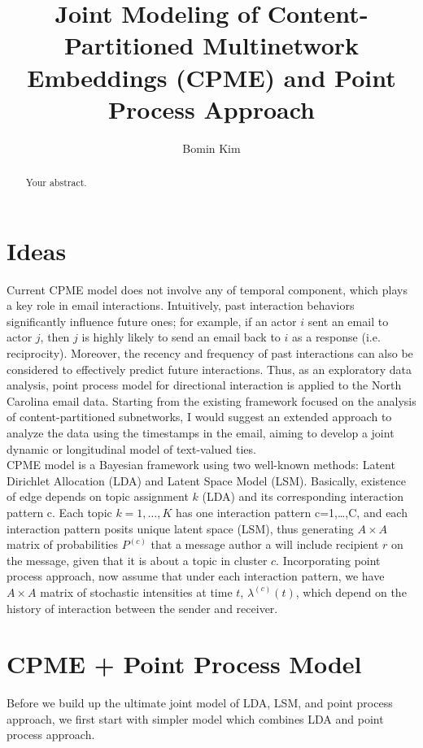 \documentclass[a4paper]{article}
\title{Joint Modeling of Content-Partitioned Multinetwork Embeddings (CPME) and Point Process Approach}
\author{Bomin Kim}
\begin{document}
\maketitle

\begin{abstract}
Your abstract.
\end{abstract}

\section{Ideas}
Current CPME model does not involve any of temporal component, which plays a key role in email interactions. Intuitively, past interaction behaviors significantly influence future ones; for example, if an actor $i$ sent an email to actor $j$, then $j$ is highly likely to send an email back to $i$ as a response (i.e. reciprocity). Moreover, the recency and frequency of past interactions can also be considered to effectively predict future interactions. Thus, as an exploratory data analysis, point process model for directional interaction is applied to the North Carolina email data. Starting from the existing framework focused on the analysis of content-partitioned subnetworks, I would suggest an extended approach to analyze the data using the timestamps in the email, aiming to develop a joint dynamic or longitudinal model of text-valued ties.\\ \newline
 CPME model is a Bayesian framework using two well-known methods: Latent Dirichlet Allocation (LDA) and Latent Space Model (LSM). Basically, existence of edge depends on topic assignment $k$ (LDA) and its corresponding interaction pattern c. Each topic $k=1,…,K$ has one interaction pattern c=1,…,C, and each interaction pattern posits unique latent space (LSM), thus generating $A\times A$ matrix of probabilities $P^{(c)}$ that a message author
a will include recipient $r$ on the message, given that it is about
a topic in cluster $c$.  Incorporating point process approach, now assume that under each interaction pattern, we have $A\times A$ matrix of stochastic intensities at time $t$, $\lambda^{(c)}(t)$, which depend on the history of interaction between the sender and receiver. 
\newpage
\section{CPME + Point Process Model}
Before we build up the ultimate joint model of LDA, LSM, and point process approach, we first start with simpler model which combines LDA and point process approach.
\end{document}
